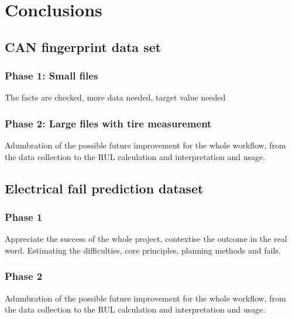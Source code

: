 \chapter{Conclusions}
\section{CAN fingerprint data set}
\subsection{Phase 1: Small files}
The facts are checked, more data needed, target value needed
\subsection{Phase 2: Large files with tire measurement}
Adumbration of the possible future improvement for the whole workflow, from the data collection to the RUL calculation and interpretation and usage.
\section{Electrical fail prediction dataset}
\subsection{Phase 1}
Appreciate the success of the whole project, contextise the outcome in the real word. Estimating the difficulties, core principles, planning methods and fails.

\subsection{Phase 2}
Adumbration of the possible future improvement for the whole workflow, from the data collection to the RUL calculation and interpretation and usage.
